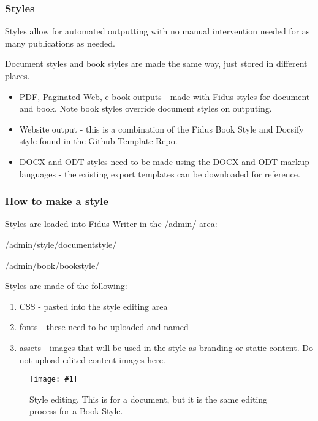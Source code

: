 \documentclass{article}
\newlength{\imgwidth}
\newcommand\scaledgraphics[2]{%
                
\settowidth{\imgwidth}{\texttt{[image: \#1]}}%
                
\setlength{\imgwidth}{\minof{\imgwidth}{#2\textwidth}}%
                
\texttt{[image: \#1]}%
                
}
\begin{document}
\subsubsection{Styles}\label{H8639904}



Styles allow for automated outputting with no manual intervention needed for as many publications as needed.


Document styles and book styles are made the same way, just stored in different places.

\begin{itemize}
\item PDF, Paginated Web, e-book outputs - made with Fidus styles for document and book. Note book styles override document styles on outputing.


\item Website output - this is a combination of the Fidus Book Style and Docsify style found in the Github Template Repo.


\item DOCX and ODT styles need to be made using the DOCX and ODT markup languages - the existing export templates can be downloaded for reference. 


\end{itemize}

\subsubsection{How to make a style}\label{H2545068}



Styles are loaded into Fidus Writer in the /admin/ area:


/admin/style/documentstyle/


/admin/book/bookstyle/


Styles are made of the following:

\begin{enumerate}
\item CSS - pasted into the style editing area


\item fonts - these need to be uploaded and named


\item assets - images that will be used in the style as branding or static content. Do not upload edited content images here.


\end{enumerate}
\begin{figure}
\scaledgraphics{3db5397f-81c3-4df8-95ea-53b51c5edad5.png}{1}
\caption*{Style editing. This is for a document, but it is the same editing process for a Book Style.}\label{F98821261}
\end{figure}
\end{document}
